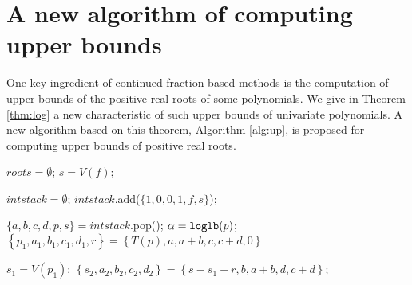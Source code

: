 
\section{A new algorithm of computing upper bounds}

One key ingredient of continued fraction based methods is the computation of upper bounds of the positive real roots of some polynomials. We give in Theorem \ref{thm:log} a new characteristic of such upper bounds of univariate polynomials. A new algorithm based on this theorem, Algorithm \ref{alg:up}, is proposed for computing upper bounds of positive real roots.

\begin{algorithm}
\caption{\algcf}
\DontPrintSemicolon
{}

 $roots=\emptyset$;
  $s=V(f)$;\;

$intstack=\emptyset$;
$intstack$.add($\{1,0,0,1,f,s\}$);\;

 {
  $\{a,b,c,d,p,s\}=intstack.$pop();
  $\alpha={\tt loglb}(p)$;\;
  $ \left\{ p_1,a_1,b_1,c_1,d_1,r \right\}=\left\{ T(p),a,a+b,c,c+d,0 \right\}$

$s_1=V(p_1)$;
$\left\{ s_2,a_2,b_2,c_2,d_2 \right\}=\left\{ s-s_1-r,b,a+b,d,c+d \right\}$;


}
\label{alg:cf}
\end{algorithm}

